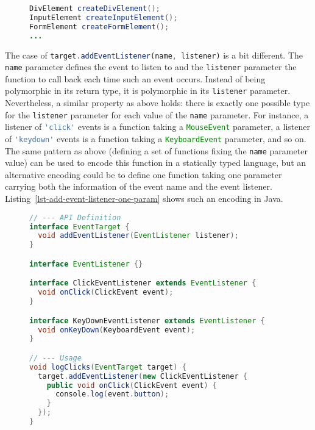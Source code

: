 \documentclass{llncs}
\newcommand{\jscode}[1]{\lstinline[language=JavaScript]|#1|}
\begin{document}
\begin{figure}
\begin{lstlisting}[label=lst-create-element-overload,language=Java,caption={Encoding of the \jscode{createElement(name)} function in Java using parameterless functions fixing the initial \jscode{name} parameter value}]
DivElement createDivElement();
InputElement createInputElement();
FormElement createFormElement();
...
\end{lstlisting}
\end{figure}

The case of \jscode{target.addEventListener(name, listener)} is a bit different. The \jscode{name} parameter defines the event to listen to and the \jscode{listener} parameter the function to call back each time such an event occurs. Instead of being polymorphic in its return type, it is polymorphic in its \jscode{listener} parameter. Nevertheless, a similar property as above holds: there is exactly one possible type for the \jscode{listener} parameter for each value of the \jscode{name} parameter. For instance, a listener of \jscode{'click'} events is a function taking a \jscode{MouseEvent} parameter, a listener of \jscode{'keydown'} events is a function taking a \jscode{KeyboardEvent} parameter, and so on. The same pattern as above (defining a set of functions fixing the \jscode{name} parameter value) can be used to encode this function in a statically typed language, but an alternative encoding could be to define one function taking one parameter carrying both the information of the event name and the 
event listener. Listing~\ref{lst-add-event-listener-one-param} shows such an encoding in Java.

\begin{figure}
\begin{lstlisting}[label=lst-add-event-listener-one-param,language=Java,caption={Encoding of the \jscode{target.addEventListener(name, listener)} function in Java using one paremeter carrying both the information of the event name and the event listener}]
// --- API Definition
interface EventTarget {
  void addEventListener(EventListener listener);
}

interface EventListener {}

interface ClickEventListener extends EventListener {
  void onClick(ClickEvent event);
}

interface KeyDownEventListener extends EventListener {
  void onKeyDown(KeyboardEvent event);
}

// --- Usage
void logClicks(EventTarget target) {
  target.addEventListener(new ClickEventListener {
    public void onClick(ClickEvent event) {
      console.log(event.button);
    }
  });
}
\end{lstlisting}
\end{figure}
\end{document}
